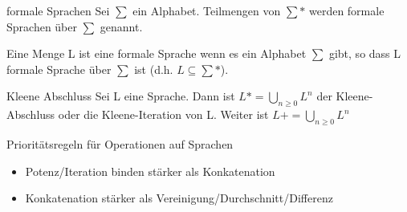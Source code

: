 \documentclass[avery5371]{flashcards}
\begin{document}
\begin{flashcard}[Definition]{formale Sprachen}
Sei $\sum$ ein Alphabet. Teilmengen von $\sum*$ werden formale Sprachen über $\sum$ genannt.

Eine Menge L ist eine formale Sprache wenn es ein Alphabet $\sum$ gibt, so dass L formale Sprache über $\sum$ ist (d.h. $L\subseteq \sum*$).
\end{flashcard}


\begin{flashcard}[Definition]{Kleene Abschluss}
    Sei L eine Sprache. Dann ist $L*=\bigcup_{n\geq 0} L^n$ der Kleene-Abschluss oder die Kleene-Iteration von L. Weiter ist $L+ = \bigcup_{n\geq 0} L^n$
\end{flashcard}
    

\begin{flashcard}[Definition]{Prioritätsregeln für Operationen auf Sprachen}
    \begin{itemize}
        \item Potenz/Iteration binden stärker als Konkatenation
        \item Konkatenation stärker als Vereinigung/Durchschnitt/Differenz
    \end{itemize}
\end{flashcard}
    
    
\end{document}
